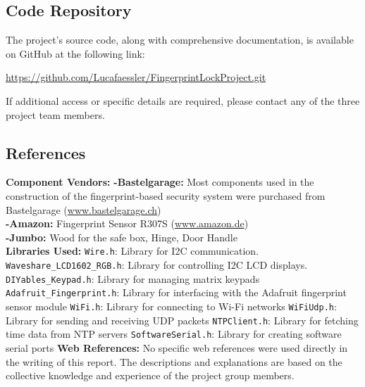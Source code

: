 \documentclass{article}
\begin{document}
\subsection{Code Repository}
The project's source code, along with comprehensive documentation, is available on GitHub at the following link: 

\href{https://github.com/Lucafaessler/FingerprintLockProject.git}{https://github.com/Lucafaessler/FingerprintLockProject.git}

If additional access or specific details are required, please contact any of the three project team members.

\subsection{References}

\textbf{Component Vendors:}
\newline
\textbf{-Bastelgarage:} Most components used in the construction of the fingerprint-based security system were purchased from Bastelgarage (\href{https://www.bastelgarage.ch/}{www.bastelgarage.ch}) \\
\textbf{-Amazon:} Fingerprint Sensor R307S (\href{https://www.amazon.de/Fingerprint-Presence-Detection-Attendance-Recognition/dp/B0CBKVRP5X/r}{www.amazon.de})  \\
\textbf{-Jumbo:} Wood for the safe box, Hinge, Door Handle\\
\newline
\textbf{Libraries Used:}
\newline
\texttt{Wire.h}: Library for I2C communication.
\newline
\texttt{Waveshare\_LCD1602\_RGB.h}: Library for controlling I2C LCD displays.
\newline
\texttt{DIYables\_Keypad.h}: Library for managing matrix keypads
\newline
\texttt{Adafruit\_Fingerprint.h}: Library for interfacing with the Adafruit fingerprint sensor module
\newline
\texttt{WiFi.h}: Library for connecting to Wi-Fi networks
\newline
\texttt{WiFiUdp.h}: Library for sending and receiving UDP packets
\newline
\texttt{NTPClient.h}: Library for fetching time data from NTP servers
\newline
\texttt{SoftwareSerial.h}: Library for creating software serial ports
\newline
\newline
\textbf{Web References:}
\newline
No specific web references were used directly in the writing of this report. The descriptions and explanations are based on the collective knowledge and experience of the project group members.
\end{document}
